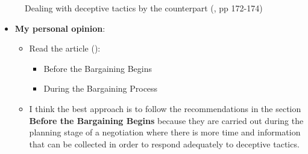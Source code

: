 \documentclass[
  ignorenonframetext,
]{beamer}
\begin{document}
\begin{frame}{}
\label{section-13}
\begin{figure}


\caption{\label{fig-dealing-with-deceptive-tactics}Dealing with
deceptive tactics by the counterpart
(, pp 172-174)}

\end{figure}%
\end{frame}

\begin{frame}{}
\label{section-14}
\begin{itemize}
\item
  \textbf{My personal opinion}:

  \begin{itemize}
  \item
    Read the article ():

    \begin{itemize}
    \item
      Before the Bargaining Begins
    \item
      During the Bargaining Process
    \end{itemize}
  \item
    I think the best approach is to follow the recommendations in the
    section \textbf{Before the Bargaining Begins} because they are
    carried out during the planning stage of a negotiation where there
    is more time and information that can be collected in order to
    respond adequately to deceptive tactics.
  \end{itemize}
\end{itemize}
\end{frame}
\end{document}
